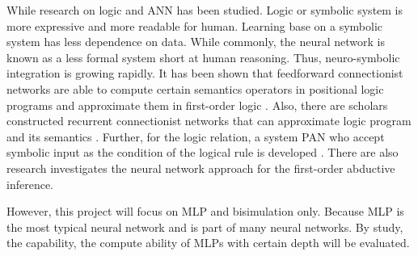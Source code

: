While research on logic and ANN has been studied. 
Logic or symbolic system is more expressive and more readable for human. 
Learning base on a symbolic system has less dependence on data.
While commonly, the neural network is known as a less formal system short at human reasoning.
Thus, neuro-symbolic integration is growing rapidly.
It has been shown that feedforward connectionist networks are able to compute certain semantics operators in positional logic programs and approximate them in first-order logic \cite{HITZLER2004245}.
Also, there are scholars constructed recurrent connectionist networks that can approximate logic program and its semantics \cite{holldobler1999approximating, Holldobler91towardsa}.
Further, for the logic relation, a system PAN who accept symbolic input as the condition of the logical rule is developed \cite{guillame2010first}.
There are also research investigates the neural network approach for the first-order abductive inference\cite{Ray_aneural}.

However, this project will focus on MLP and bisimulation only.
Because MLP is the most typical neural network and is part of many neural networks.
By study, the capability, the compute ability of MLPs with certain depth will be evaluated.


